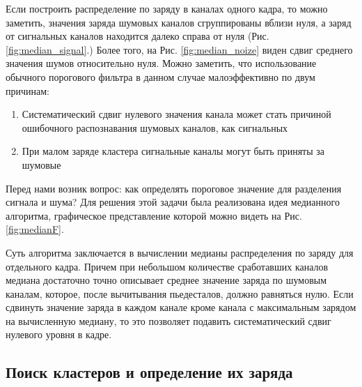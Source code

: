 Если построить распределение по заряду в каналах одного кадра, то можно заметить, значения заряда шумовых каналов  сгруппированы вблизи нуля, а заряд от сигнальных каналов находится далеко справа от нуля (Рис. \ref{fig:median_signal}.) Более того, на Рис. \ref{fig:median_noize} виден сдвиг среднего значения шумов относительно нуля. Можно заметить, что использование обычного порогового фильтра в данном случае малоэффективно по двум причинам:
\begin{enumerate}
	\item Систематический сдвиг нулевого значения канала может стать причиной ошибочного распознавания шумовых каналов, как сигнальных
	\item При малом заряде кластера сигнальные каналы могут быть приняты за шумовые
\end{enumerate}
 Перед нами возник вопрос: как определять пороговое значение для разделения сигнала и шума? Для решения этой задачи была реализована идея медианного алгоритма, графическое представление которой можно видеть на Рис.\ref{fig:medianF}. 
 \par Суть алгоритма заключается в вычислении медианы распределения по заряду для отдельного кадра. Причем при небольшом количестве сработавших каналов медиана достаточно точно описывает среднее значение заряда по шумовым каналам, которое, после вычитывания пьедесталов, должно равняться нулю. Если сдвинуть значение заряда в каждом канале кроме канала с максимальным зарядом на вычисленную медиану, то это позволяет подавить систематический сдвиг нулевого уровня в кадре. 
 \subsection{Поиск кластеров и определение их заряда}
 
 
 
